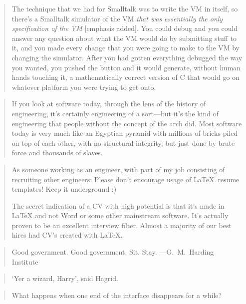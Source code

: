 \documentclass[a4paper]{article}
\begin{document}
\medskip
\begin{quote}
	The technique that we had for Smalltalk was to write the VM
	in itself, so there's a Smalltalk simulator of the VM \emph{that
	was essentially the only specification of the VM} [emphasis added].
	You could debug
	and you could answer any question about what the VM would do by
	submitting stuff to it, and you made every change that you were
	going to make to the VM by changing the simulator. After you had
	gotten everything debugged the way you wanted, you pushed the
	button and it would generate, without human hands touching it,
	a mathematically correct version of C that would go on whatever
	platform you were trying to get onto.~\citep{Feldman2004a}
\end{quote}

\medskip
\begin{quote}
	If you look at software today, through the lens of the history
	of engineering, it's certainly engineering of a sort---but it's
	the kind of engineering that people without the concept of the
	arch did. Most software today is very much like an Egyptian
	pyramid with millions of bricks piled on top of each other,
	with no structural integrity, but just done by brute force and
	thousands of slaves.~\citep{Feldman2004a}
\end{quote}

\medskip
\begin{quote}
	As someone working as an engineer, with part of my job consisting
	of recruiting other engineers: Please don't encourage usage of
	\LaTeX\ resume templates! Keep it underground :)

	The secret indication of a CV with high potential is that it's
	made in LaTeX and not Word or some other mainstream software. It's
	actually proven to be an excellent interview filter. Almost a
	majority of our best hires had CV's created with
	\LaTeX .~\citep{solemngirl2009a}
\end{quote}

\medskip
\begin{quote}
	Good government. Good government. Sit. Stay.
	---G.~M.~Harding Institute~\citep{SixWordStories2009a}
\end{quote}

\medskip
\begin{quote}
	`Yer a wizard, Harry', said Hagrid.~\citep{SixWordStories2009b}
\end{quote}

\medskip
\begin{quote}
	What happens when one end of the interface disappears for a
	while?~\cite{Nygard2009a}
\end{quote}
\end{document}
